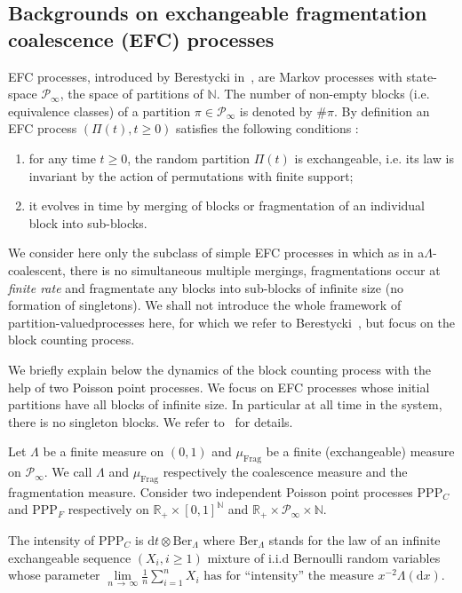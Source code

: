 \documentclass[AHL,Unicode,longabstracts,published]{cedram}
\newcommand{\ddr}{\mathrm{d}}
\newcommand{\PPP}{\mathrm{PPP}}
\newcommand{\Frag}{\mathrm{Frag}}
\newcommand{\Ber}{\mathrm{Ber}}
\newcommand{\bbN}{\mathbb{N}}
\newcommand{\bbR}{\mathbb{R}}
\newcommand{\clP}{\mathcal{P}}
\newcommand*{\romanenumi}{\renewcommand*{\theenumi}{\roman{enumi}}}
\begin{document}
\subsection{Backgrounds on exchangeable fragmentation coalescence (EFC) processes}\label{backgroundEFC}


EFC processes, introduced by Berestycki in~\cite{MR2110018}, are Markov processes with state-space $\clP_\infty$, the space of partitions of $\bbN$. The number of non-empty blocks (i.e. equivalence classes) of a partition $\pi\in \clP_\infty$ is denoted by $\#\pi$. By definition an EFC process $(\Pi(t),t\geq 0)$ satisfies the following conditions :
\begin{enumerate}\romanenumi
\item for any time $t\geq 0$, the random partition $\Pi(t)$ is exchangeable, i.e. its law is invariant by the action of permutations with finite support;
\item it evolves in time by merging of blocks or fragmentation of an individual block into sub-blocks.
\end{enumerate}
We consider here only the subclass of simple EFC processes in which as in a\linebreak $\Lambda$-coalescent, there is no simultaneous multiple mergings, fragmentations occur at \emph{finite rate} and fragmentate any blocks into sub-blocks of infinite size (no formation of singletons). We shall not introduce the whole framework of partition-valued\linebreak processes here, for which we refer to Berestycki~\cite{MR2110018}, but focus on the block counting process.

We briefly explain below the dynamics of the block counting process with the help of two Poisson point processes. We focus on EFC processes whose initial partitions have all blocks of infinite size. In particular at all time in the system, there is no singleton blocks. We refer to~\cite[Sections~2.1 and 2.2]{cdiEFC} for details.

Let $\Lambda$ be a finite measure on $(0,1)$ and $\mu_{\Frag}$ be a finite (exchangeable) measure on $\clP_\infty$. We call $\Lambda$ and $\mu_{\Frag}$ respectively the coalescence measure and the fragmentation measure. Consider two independent Poisson point processes $\PPP_C$ and $\PPP_F$ respectively on $\bbR_+\times [0,1]^{\bbN}$ and $\bbR_+\times \clP _\infty\times \bbN$.

The intensity of $\PPP_C$ is $\ddr t\otimes \Ber_{\Lambda}$ where $\Ber_{\Lambda}$ stands for the law of an infinite exchangeable sequence $(X_i,i\geq 1)$ mixture of i.i.d Bernoulli random variables whose parameter $\underset{n\,\rightarrow\,\infty}{\lim}\frac{1}{n}\sum_{i=1}^{n}X_i \text{ has for ``intensity'' the measure } x^{-2}\Lambda(\ddr x).$
\end{document}
